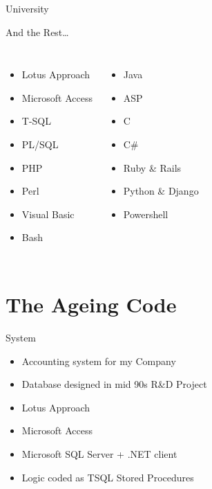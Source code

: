 \documentclass{beamer}
\begin{document}
\begin{frame}{University}
\begin{figure}
    \end{figure}
  \end{frame}

  \begin{frame}{And the Rest\ldots}
    \begin{columns}
          \begin{itemize}
            \item Lotus Approach
            \item Microsoft Access
            \item T-SQL
            \item PL/SQL
            \item PHP
            \item Perl
            \item Visual Basic
            \item Bash
          \end{itemize}
          \begin{itemize}
            \item Java
            \item ASP
            \item C
            \item C\#
            \item Ruby \& Rails
            \item Python \& Django
            \item Powershell
          \end{itemize}
      \end{columns}
  \end{frame}

\section{The Ageing Code}

  \begin{frame}{System}
    \begin{itemize}
      \item Accounting system for my Company
      \pause
      \item Database designed in mid 90s R\&D Project
      \pause
      \item Lotus Approach
      \pause
      \item Microsoft Access
      \pause
      \item Microsoft SQL Server + .NET client
      \item Logic coded as TSQL Stored Procedures
    \end{itemize}
  \end{frame}
\end{document}
